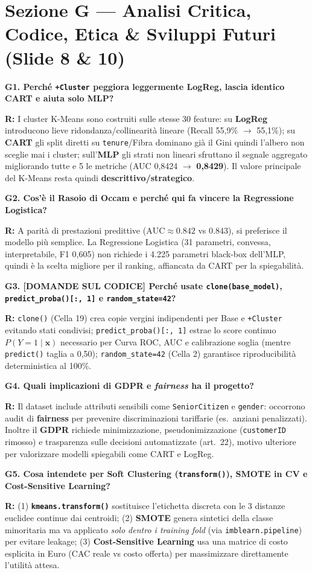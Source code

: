 \documentclass[10pt, a4paper]{article}
\newcommand{\qa}[2]{%
  \par\vspace{4pt}\noindent\textbf{\color{PrimaryNavy}#1}\par\vspace{1pt}%
  \noindent\textbf{\color{SecondaryBlue}R:} #2\par\vspace{2pt}%
}
\begin{document}
\section*{Sezione G --- Analisi Critica, Codice, Etica \& Sviluppi Futuri (Slide 8 \& 10)}

\qa{G1. Perché \texttt{+Cluster} peggiora leggermente LogReg, lascia identico CART e aiuta solo MLP?}{
I cluster K-Means sono costruiti sulle stesse 30 feature: su \textbf{LogReg} introducono lieve ridondanza/collinearità lineare (Recall 55,9\% $\rightarrow$ 55,1\%); su \textbf{CART} gli split diretti su \texttt{tenure}/Fibra dominano già il Gini quindi l'albero non sceglie mai i cluster; sull'\textbf{MLP} gli strati non lineari sfruttano il segnale aggregato migliorando tutte e 5 le metriche (AUC 0,8424 $\rightarrow$ \textbf{0,8429}). Il valore principale del K-Means resta quindi \textbf{descrittivo/strategico}.}

\qa{G2. Cos'è il Rasoio di Occam e perché qui fa vincere la Regressione Logistica?}{
A parità di prestazioni predittive ($\text{AUC}\approx 0.842$ vs $0.843$), si preferisce il modello più semplice. La Regressione Logistica (31 parametri, convessa, interpretabile, F1 0,605) non richiede i 4.225 parametri black-box dell'MLP, quindi è la scelta migliore per il ranking, affiancata da CART per la spiegabilità.}

\qa{G3. [DOMANDE SUL CODICE] Perché usate \texttt{clone(base\_model)}, \texttt{predict\_proba()[:, 1]} e \texttt{random\_state=42}?}{
\texttt{clone()} (Cella 19) crea copie vergini indipendenti per Base e \texttt{+Cluster} evitando stati condivisi; \texttt{predict\_proba()[:, 1]} estrae lo score continuo $P(Y=1\mid\mathbf{x})$ necessario per Curva ROC, AUC e calibrazione soglia (mentre \texttt{predict()} taglia a 0,50); \texttt{random\_state=42} (Cella 2) garantisce riproducibilità deterministica al 100\%.}

\qa{G4. Quali implicazioni di GDPR e \textit{fairness} ha il progetto?}{
Il dataset include attributi sensibili come \texttt{SeniorCitizen} e \texttt{gender}: occorrono audit di \textbf{fairness} per prevenire discriminazioni tariffarie (es.\ anziani penalizzati). Inoltre il \textbf{GDPR} richiede minimizzazione, pseudonimizzazione (\texttt{customerID} rimosso) e trasparenza sulle decisioni automatizzate (art.\ 22), motivo ulteriore per valorizzare modelli spiegabili come CART e LogReg.}

\qa{G5. Cosa intendete per Soft Clustering (\texttt{transform()}), SMOTE in CV e Cost-Sensitive Learning?}{
(1) \textbf{\texttt{kmeans.transform()}} sostituisce l'etichetta discreta con le 3 distanze euclidee continue dai centroidi; (2) \textbf{SMOTE} genera sintetici della classe minoritaria ma va applicato \textit{solo dentro i training fold} (via \texttt{imblearn.pipeline}) per evitare leakage; (3) \textbf{Cost-Sensitive Learning} usa una matrice di costo esplicita in Euro (CAC reale vs costo offerta) per massimizzare direttamente l'utilità attesa.}
\end{document}

